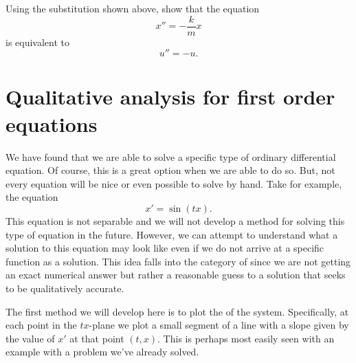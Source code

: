         \begin{exercise}
        Using the substitution shown above, show that the equation
        \[
        x'' = -\frac{k}{m}x
        \]
        is equivalent to
        \[
        u''=-u.
        \]
        \end{exercise}

        \section{Qualitative analysis for first order equations}

            We have found that we are able to solve a specific type of ordinary differential equation.  Of course, this is a great option when we are able to do so. But, not every equation will be nice or even possible to solve by hand.  Take for example, the equation
            \[
            x'=\sin(tx).
            \]
            This equation is not separable and we will not develop a method for solving this type of equation in the future. However, we can attempt to understand what a solution to this equation may look like even if we do not arrive at a specific function as a solution. This idea falls into the category of  since we are not getting an exact numerical answer but rather a reasonable guess to a solution that seeks to be qualitatively accurate.


            The first method we will develop here is to plot the   of the system.  Specifically, at each point in the $tx$-plane we plot a small segment of a line with a slope given by the value of $x'$ at that point $(t,x)$.  This is perhaps most easily seen with an example with a problem we've already solved.

